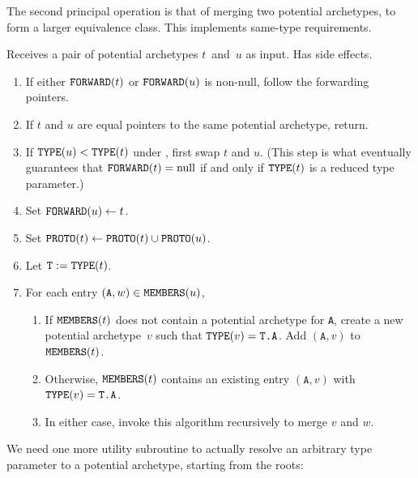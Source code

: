 \documentclass[../generics]{subfiles}
\begin{document}
The second principal operation is that of merging two potential archetypes, to form a larger equivalence class. This implements same-type requirements.

\begin{algorithm}\label{archetype builder merge}
Receives a pair of potential archetypes $t$~and~$u$ as input. Has side effects.
\begin{enumerate}
\item If either $\texttt{FORWARD}(t)$ or $\texttt{FORWARD}(u)$ is non-null, follow the forwarding pointers.
\item If $t$ and $u$ are equal pointers to the same potential archetype, return.
\item If $\texttt{TYPE}(u)<\texttt{TYPE}(t)$ under , first swap $t$ and $u$. (This step is what eventually guarantees that $\texttt{FORWARD}(t)=\text{null}$ if and only if $\texttt{TYPE}(t)$ is a reduced type parameter.)
\item Set $\texttt{FORWARD}(u)\leftarrow t$.
\item Set $\texttt{PROTO}(t)\leftarrow\texttt{PROTO}(t)\cup\texttt{PROTO}(u)$.
\item Let $\texttt{T}:=\texttt{TYPE}(t)$.
\item For each entry $(\texttt{A},w)\in\texttt{MEMBERS}(u)$,
\begin{enumerate}
\item If $\texttt{MEMBERS}(t)$ does not contain a potential archetype for \texttt{A}, create a new potential archetype~$v$ such that $\texttt{TYPE}(v)=\texttt{T.A}$. Add $(\texttt{A},v)$ to $\texttt{MEMBERS}(t)$.
\item Otherwise, $\texttt{MEMBERS}(t)$ contains an existing entry $(\texttt{A}, v)$ with $\texttt{TYPE}(v)=\texttt{T.A}$.
\item In either case, invoke this algorithm recursively to merge $v$ and $w$.
\end{enumerate}
\end{enumerate}
\end{algorithm}

We need one more utility subroutine to actually resolve an arbitrary type parameter to a potential archetype, starting from the roots:
\end{document}
